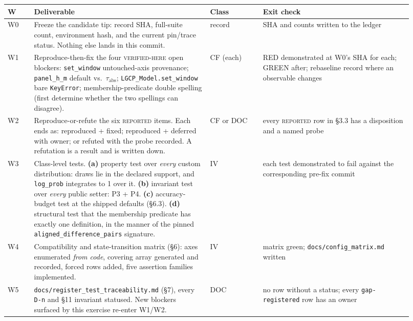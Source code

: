 \documentclass[11pt]{article}
\newcommand{\vfy}{\textsc{verified-here}}
\newcommand{\rep}{\textsc{reported}}
\renewcommand{\tt}[1]{\texttt{#1}}
\newcommand{\tabs}{\ensuremath{\tau_{\mathrm{abs}}}}
\begin{document}
\begin{longtable}{@{}
  >{\raggedright\arraybackslash}p{0.06\linewidth}
  >{\raggedright\arraybackslash}p{0.40\linewidth}
  >{\raggedright\arraybackslash}p{0.12\linewidth}
  >{\raggedright\arraybackslash}p{0.34\linewidth}@{}}
\toprule
W & Deliverable & Class & Exit check \\
\midrule
\endhead
W0 & Freeze the candidate tip: record SHA, full-suite count, environment hash, and the
current pin/trace status. Nothing else lands in this commit. & record & SHA and counts
written to the ledger \\
\addlinespace[3pt]
W1 & Reproduce-then-fix the four \vfy{} open blockers: \tt{set\_window} untouched-axis
provenance; \tt{panel\_h\_m} default vs.\ \tabs; \tt{LGCP\_Model.set\_window} bare
\tt{KeyError}; membership-predicate double spelling (first determine whether the two
spellings can disagree). & CF (each) & RED demonstrated at W0's SHA for each; GREEN after;
rebaseline record where an observable changes \\
\addlinespace[3pt]
W2 & Reproduce-or-refute the six \rep{} items. Each ends as: reproduced + fixed;
reproduced + deferred with owner; or refuted with the probe recorded. A refutation is a
result and is written down. & CF or DOC & every \rep{} row in \S3.3 has a disposition and
a named probe \\
\addlinespace[3pt]
W3 & Class-level tests. \textbf{(a)} property test over \emph{every} custom distribution:
draws lie in the declared support, and \tt{log\_prob} integrates to 1 over it.
\textbf{(b)} invariant test over \emph{every} public setter: P3 + P4. \textbf{(c)}
accuracy-budget test at the shipped defaults (\S6.3). \textbf{(d)} structural test that
the membership predicate has exactly one definition, in the manner of the pinned
\tt{aligned\allowbreak{}\_difference\allowbreak{}\_pairs} signature. & IV & each test demonstrated to fail
against the corresponding pre-fix commit \\
\addlinespace[3pt]
W4 & Compatibility and state-transition matrix (\S6): axes enumerated \emph{from code},
covering array generated and recorded, forced rows added, five assertion families
implemented. & IV & matrix green; \tt{docs/config\allowbreak{}\_matrix.md} written \\
\addlinespace[3pt]
W5 & \tt{docs/register\allowbreak{}\_test\allowbreak{}\_traceability.md} (\S7), every \tt{D-n} and \S11 invariant
statused. New blockers surfaced by this exercise re-enter W1/W2. & DOC & no row without a
status; every \tt{gap-registered} row has an owner \\

\end{longtable}
\end{document}
